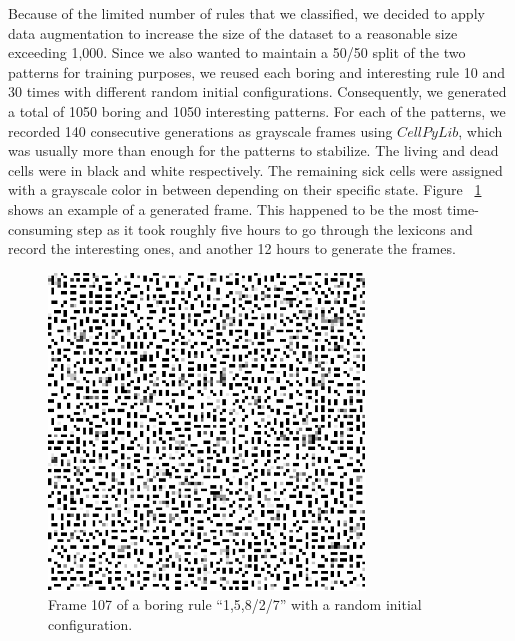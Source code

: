 \documentclass[12pt]{article}
\numberwithin{figure}{section} %
\begin{document}
Because of the limited number of rules that we classified, we decided to apply data augmentation to increase the size of the dataset to a reasonable size exceeding 1,000. Since we also wanted to maintain a 50/50 split of the two patterns for training purposes, we reused each boring and interesting rule 10 and 30 times with different random initial configurations. Consequently, we generated a total of 1050 boring and 1050 interesting patterns. For each of the patterns, we recorded 140 consecutive generations as grayscale frames using $CellPyLib$, which was usually more than enough for the patterns to stabilize. The living and dead cells were in black and white respectively. The remaining sick cells were assigned with a grayscale color in between depending on their specific state. Figure ~\ref{fig:generated frame example} shows an example of a generated frame. This happened to be the most time-consuming step as it took roughly five hours to go through the lexicons and record the interesting ones, and another 12 hours to generate the frames. 

\begin{figure}[H]
	\centering
	\includegraphics[width=0.5\linewidth]{Section3/1}
	\caption[Example of a generated frame]{Frame 107 of a boring rule “1,5,8/2/7” with a random initial configuration.}
	\vspace{-1.5em}
	\label{fig:generated frame example}
\end{figure}
\end{document}
